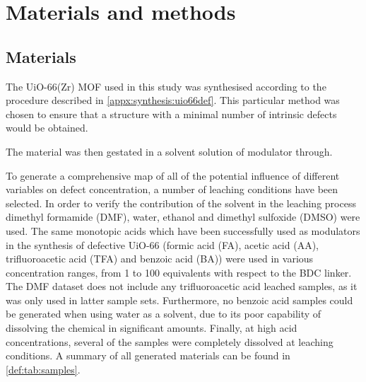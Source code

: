 
\section{Materials and methods}

\subsection{Materials}

The UiO-66(Zr) MOF used in this study was synthesised according
to the procedure described in \autoref{appx:synthesis:uio66def}.
This particular method was chosen to ensure that a structure with
a minimal number of intrinsic defects would be obtained.

The material was then gestated in a solvent solution of modulator
through.

To generate a comprehensive map of all of the potential influence
of different variables on defect concentration, a number of
leaching conditions have been selected. In order to verify the
contribution of the solvent in the leaching process
dimethyl formamide (DMF), water, ethanol and dimethyl sulfoxide (DMSO)
were used. The same monotopic acids which have been successfully used
as modulators in the synthesis of defective UiO-66
(formic acid (FA), acetic acid (AA), trifluoroacetic acid (TFA)
and benzoic acid (BA)) were used in various concentration ranges,
from 1 to 100 equivalents with respect to the BDC linker.
The DMF dataset does not include any trifluoroacetic acid
leached samples, as it was only used in latter sample sets.
Furthermore, no benzoic acid samples could be generated when using
water as a solvent, due to its poor capability of dissolving the
chemical in significant amounts. Finally, at high acid concentrations,
several of the samples were completely dissolved at leaching
conditions.
A summary of all generated materials can be found in
\autoref{def:tab:samples}.

